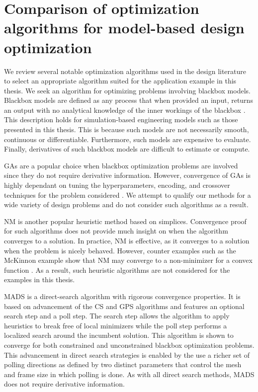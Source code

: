 {\color{red} 
\section{Comparison of optimization algorithms for model-based design optimization} 
\label{sec:optLR}

We review several notable optimization algorithms used in the design literature to select an appropriate algorithm suited for the application example in this thesis. We seek an algorithm for optimizing problems involving blackbox models. Blackbox models are defined as any process that when provided an input, returns an output with no analytical knowledge of the inner workings of the blackbox \cite{Audet2017}. This description holds for simulation-based engineering models such as those presented in this thesis. This is because such models are not necessarily smooth, continuous or differentiable. Furthermore, such models are expensive to evaluate. Finally, derivatives of such blackbox models are difficult to estimate or compute. 

\Acfp{GA} are a popular choice when blackbox optimization problems are involved since they do not require derivative information. However, convergence of \acp{GA} is highly dependant on tuning the hyperparameters, encoding, and crossover techniques for the problem considered \cite{Audet2017}. We attempt to qualify our methods for a wide variety of design problems and do not consider such algorithms as a result.

\Ac{NM} is another popular heuristic method based on simplices. Convergence proof for such algorithms does not provide much insight on when the algorithm converges to a solution. In practice, \ac{NM} is effective, as it converges to a solution when the problem is nicely behaved. However, counter examples such as the McKinnon example show that \ac{NM} may converge to a non-minimizer for a convex function \cite{Audet2017}. As a result, such heuristic algorithms are not considered for the examples in this thesis.

\Ac{MADS} is a direct-search algorithm with rigorous convergence properties. It is based on advancement of the \ac{CS} and \ac{GPS} algorithms and features an optional search step and a poll step. The search step allows the algorithm to apply heuristics to break free of local minimizers while the poll step performs a localized search around the incumbent solution. This algorithm is shown to converge for both constrained and unconstrained blackbox optimization problems. This advancement in direct search strategies is enabled by the use a richer set of polling directions as defined by two distinct parameters that control the mesh and frame size in which polling is done. As with all direct search methods, \ac{MADS} does not require derivative information.

}
